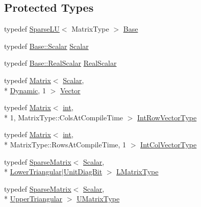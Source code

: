 \subsection*{Protected Types}
\begin{DoxyCompactItemize}
\item 
typedef \hyperlink{class_sparse_l_u}{Sparse\-L\-U}$<$ Matrix\-Type $>$ \hyperlink{class_sparse_l_u_3_01_matrix_type_00_01_super_l_u_01_4_ac408a79e1a4e8fb823d8ec9bb9d1bded}{Base}
\item 
typedef \hyperlink{class_sparse_l_u_a1c13b088bd115436caa27f0f8f0c26fd}{Base\-::\-Scalar} \hyperlink{class_sparse_l_u_3_01_matrix_type_00_01_super_l_u_01_4_ae21a6c1f9f89d9345035a47e161d8ac7}{Scalar}
\item 
typedef \hyperlink{class_sparse_l_u_a1090bc6ec27ebb0b088f6a1bf2ad6eab}{Base\-::\-Real\-Scalar} \hyperlink{class_sparse_l_u_3_01_matrix_type_00_01_super_l_u_01_4_aa3cef21ac23d8f5ffe8709bc9178ab23}{Real\-Scalar}
\item 
typedef \hyperlink{class_matrix}{Matrix}$<$ \hyperlink{class_sparse_l_u_3_01_matrix_type_00_01_super_l_u_01_4_ae21a6c1f9f89d9345035a47e161d8ac7}{Scalar}, \\*
\hyperlink{_constants_8h_adc9da5be31bdce40c25a92c27999c0e3}{Dynamic}, 1 $>$ \hyperlink{class_sparse_l_u_3_01_matrix_type_00_01_super_l_u_01_4_a3cf266f148229c44f36eee6be889db6e}{Vector}
\item 
typedef \hyperlink{class_matrix}{Matrix}$<$ \hyperlink{ioapi_8h_a787fa3cf048117ba7123753c1e74fcd6}{int}, \\*
1, Matrix\-Type\-::\-Cols\-At\-Compile\-Time $>$ \hyperlink{class_sparse_l_u_3_01_matrix_type_00_01_super_l_u_01_4_a341f04a651379c2395a17abc5a566ccf}{Int\-Row\-Vector\-Type}
\item 
typedef \hyperlink{class_matrix}{Matrix}$<$ \hyperlink{ioapi_8h_a787fa3cf048117ba7123753c1e74fcd6}{int}, \\*
Matrix\-Type\-::\-Rows\-At\-Compile\-Time, 1 $>$ \hyperlink{class_sparse_l_u_3_01_matrix_type_00_01_super_l_u_01_4_a904f8c9f7dcd198fcc6fd897cec1ac8e}{Int\-Col\-Vector\-Type}
\item 
typedef \hyperlink{class_sparse_matrix}{Sparse\-Matrix}$<$ \hyperlink{class_sparse_l_u_3_01_matrix_type_00_01_super_l_u_01_4_ae21a6c1f9f89d9345035a47e161d8ac7}{Scalar}, \\*
\hyperlink{_constants_8h_a9c6e15884c02c8075e3575670fe06894}{Lower\-Triangular}$|$\hyperlink{group__flags_ga254555b50eae5fa8a8d241f6bc08939a}{Unit\-Diag\-Bit} $>$ \hyperlink{class_sparse_l_u_3_01_matrix_type_00_01_super_l_u_01_4_a456d27de5a655bef64e8d749e80e3aad}{L\-Matrix\-Type}
\item 
typedef \hyperlink{class_sparse_matrix}{Sparse\-Matrix}$<$ \hyperlink{class_sparse_l_u_3_01_matrix_type_00_01_super_l_u_01_4_ae21a6c1f9f89d9345035a47e161d8ac7}{Scalar}, \\*
\hyperlink{_constants_8h_a96ca999d353b2e4ed0976aab836d047a}{Upper\-Triangular} $>$ \hyperlink{class_sparse_l_u_3_01_matrix_type_00_01_super_l_u_01_4_ae359d4920c56a9ac93bc728bc0d04b77}{U\-Matrix\-Type}
\end{DoxyCompactItemize}
